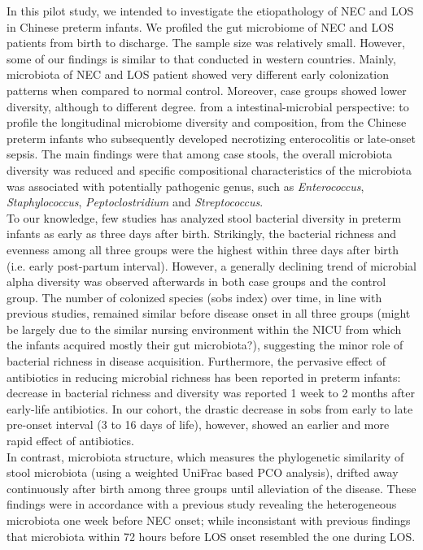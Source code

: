 \documentclass[fleqn,10pt]{wlpeerj} %
\begin{document}
\noindent
In this pilot study, we intended to investigate the etiopathology of NEC and LOS in Chinese preterm infants.  We profiled the gut microbiome of NEC and LOS patients from birth to discharge. The sample size was relatively small.  However, some of our findings is similar to that conducted in western countries.  Mainly, microbiota of NEC and LOS patient showed very different early colonization patterns when compared to normal control. Moreover, case groups showed lower diversity, although to different degree. from a intestinal-microbial perspective: to profile the longitudinal microbiome diversity and composition, from the Chinese preterm infants who subsequently developed necrotizing enterocolitis or late-onset sepsis. The main findings were that among case stools, the overall microbiota diversity was reduced and specific compositional characteristics of the microbiota was associated with potentially pathogenic genus, such as \textit{Enterococcus}, \textit{Staphylococcus}, \textit{Peptoclostridium} and \textit{Streptococcus}.\\

\noindent
To our knowledge, few studies has analyzed stool bacterial diversity in preterm infants as early as three days after birth. Strikingly, the bacterial richness and evenness among all three groups were the highest within three days after birth (i.e. early post-partum interval). However, a generally declining trend of microbial alpha diversity was observed afterwards in both case groups and the control group. The number of colonized species (sobs index) over time, in line with previous studies\citep{mai2011fecal, mai2013distortions}, remained similar before disease onset in all three groups (might be largely due to the similar nursing environment within the NICU from which the infants acquired mostly their gut microbiota?), suggesting the minor role of bacterial richness in disease acquisition. Furthermore, the pervasive effect of antibiotics in reducing microbial richness has been reported in preterm infants: decrease in bacterial richness and diversity was reported 1 week to 2 months after early-life antibiotics\citep{digiulio2008microbial, dethlefsen2011incomplete, fouhy2012high, greenwood2014early, tanaka2009influence}. In our cohort, the drastic decrease in sobs from early to late pre-onset interval (3 to 16 days of life), however, showed an earlier and more rapid effect of antibiotics. \\

\noindent
In contrast, microbiota structure, which measures the phylogenetic similarity of stool microbiota (using a weighted UniFrac based PCO analysis), drifted away continuously after birth among three groups until alleviation of the disease. These findings were in accordance with a previous study revealing the heterogeneous microbiota one week before NEC onset\citep{mai2011fecal}; while inconsistant with previous findings that microbiota within 72 hours before LOS onset resembled the one during LOS\citep{mai2013distortions}.\\
\end{document}
